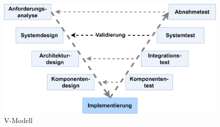 \documentclass[a4paper, portrait, 12pt]{scrartcl} %
\begin{document}
\begin{figure}[H]
\centering
    \includegraphics[scale=0.14]{V_Modell.png} 
	\caption{V-Modell}
\end{figure}
\end{document}
